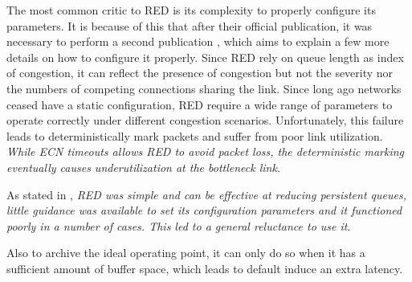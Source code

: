 The most common critic to RED is its complexity to properly configure its
parameters. It is because of this that after their official publication, it
was necessary to perform a second publication \cite{NotesRED}, which aims to
explain a few more details on how to configure it properly. Since RED rely on
queue length as index of congestion, it can reflect the presence of congestion
but not the severity nor the numbers of competing connections sharing the
link. Since long ago networks ceased have a static configuration, RED require
a wide range of parameters to operate correctly under different congestion
scenarios. Unfortunately, this failure leads to deterministically mark packets
and suffer from poor link utilization. \textit{While  ECN timeouts allows RED
to avoid packet loss, the deterministic marking eventually causes
underutilization at the bottleneck link}\cite{FengBLUEAQM}.

As stated in \cite{NicholsJacobsonCQD}, \textit{RED was simple and can be
effective at reducing persistent queues, little guidance was available to set
its configuration parameters and it functioned poorly in a number of cases.
This led to a general reluctance to use it}.

Also to archive the ideal operating point, it can only do so when it has a
sufficient amount of buffer space, which leads to default induce an extra
latency.
